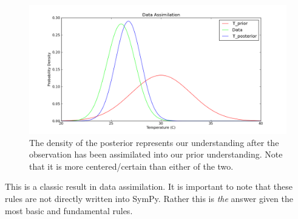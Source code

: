 \begin{figure}[ht]
\vspace{-0pt}
\centering
\includegraphics[width=.7\textwidth]{images/posterior.png}
\vspace{-0pt}
\caption{The density of the posterior represents our understanding after the observation has been assimilated into our prior understanding. Note that it is more centered/certain than either of the two. }
\label{fig:DA_posterior}
\vspace{00pt}
\end{figure}

This is a classic result in data assimilation. It is important to note that these rules are not directly written into SymPy. Rather this is \textit{the} answer given the most basic and fundamental rules. 
